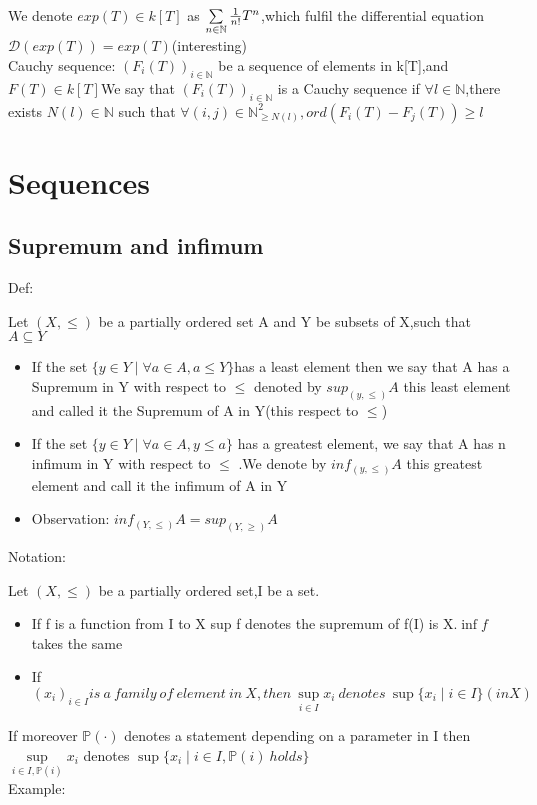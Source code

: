 \documentclass{book}
\begin{document}
We denote $exp(T)\in k[T]$ as $\sum\limits_{n\in\mathbb{N}}{1\over n!}T^n$,which fulfil the differential equation $\mathcal{D}(exp(T))=exp(T)$(interesting)\\
Cauchy sequence: $(F_i(T))_{i\in\mathbb{N}}$ be a sequence of elements in k[T],and $F(T)\in k[T]$We say that $(F_i(T))_{i\in \mathbb{N}}$ is a Cauchy sequence if $\forall l \in \mathbb{N}$,there exists $N(l)\in \mathbb{N}$ such that $\forall(i,j)\in\mathbb{N}^2_{\geq N(l)},ord(F_i(T)-F_j(T))\geq l$
\part{Sequences}
\chapter{Supremum and infimum}
Def:

Let $(X,\le)$ be a partially ordered set A and Y be subsets of X,such that $A\subseteq Y$
\begin{itemize}
    \item If the set $\{y\in Y\mid \forall a \in A,a\leq Y\}$has a least element then we say that A has a Supremum in Y with respect to $\leq$ denoted by $sup_{(y,\leq)}A$ this least element and called it the Supremum of A in Y(this respect to $\leq$)
    \item If the set $\{y\in Y\mid\forall a\in A,y\leq a\}$ has a greatest element, we say that A has n infimum in Y with respect to $\leq$ .We denote by $inf_{(y,\leq)}A$ this greatest element and call it the infimum of A in Y 
    \item Observation: $inf_{(Y,\leq)}A=sup_{(Y,\geq)}A$
\end{itemize}
Notation:

Let $(X,\leq)$ be a partially ordered set,I be a set.
\begin{itemize}
    \item If f is a function from I to X sup f denotes the supremum of f(I) is X.$\inf f $takes the same
    \item If $(x_i)_{i\in I} is \ a\ family\ of\ element\ in\ X,then\ \sup \limits_{i\in I}x_i\ denotes\ \sup\{x_i\mid i\in I\} (in X)$
\end{itemize}

If moreover $\mathbb{P}(\cdot)$ denotes a statement depending on a parameter in I then $\sup\limits_{i\in I,\mathbb{P}(i)}x_i$ denotes $\sup\{x_i\mid i\in I,\mathbb{P}(i)\ holds\}$\\
Example:
\end{document}
